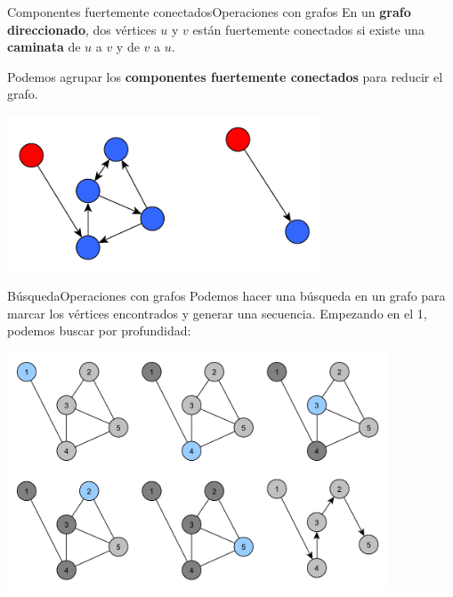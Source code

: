 \documentclass[spanish, c]{beamer}
\begin{document}
\begin{frame}{Componentes fuertemente conectados}{Operaciones con grafos}
En un \textbf{grafo direccionado}, dos vértices $u$ y $v$ están \alert{fuertemente conectados} si existe una \textbf{caminata} de $u$ a $v$ y de $v$ a $u$.

\bigskip

Podemos agrupar los \textbf{componentes fuertemente conectados} para reducir el grafo.

\begin{center}
    \includegraphics[width=0.7\textwidth]{stronglyconnected.pdf}
\end{center}
\end{frame}

\begin{frame}{Búsqueda}{Operaciones con grafos}
    Podemos hacer una \alert{búsqueda} en un grafo para marcar los vértices encontrados y generar una secuencia. Empezando en el 1, podemos buscar por \alert{profundidad}:
    \begin{center}
        \includegraphics[width=0.85\textwidth]{dfs.pdf}
    \end{center}
\end{frame}
\end{document}
